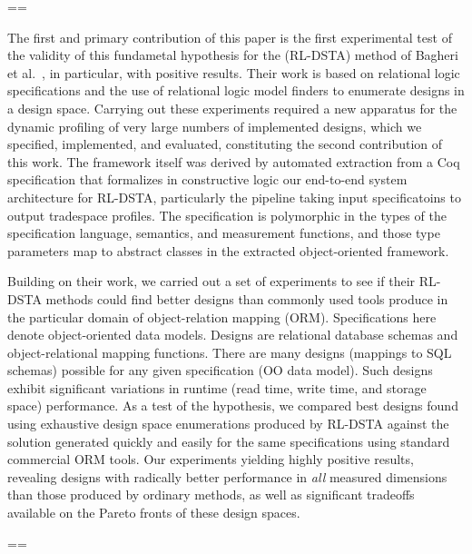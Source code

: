 ==

The first and primary contribution of this paper is the first experimental test of the validity of this fundametal hypothesis for the (RL-DSTA) method of Bagheri et al.~\cite{}, in particular, with positive results. Their work is based on relational logic specifications and the use of relational logic model finders to enumerate designs in a design space. Carrying out these experiments required a new apparatus for the dynamic profiling of very large numbers of implemented designs, which we specified, implemented, and evaluated, constituting the second contribution of this work. The framework itself was derived by automated extraction from a Coq specification that formalizes in constructive logic our end-to-end system architecture for RL-DSTA, particularly the pipeline taking input specificatoins to output tradespace profiles. The specification is polymorphic in the types of the specification language, semantics, and measurement functions, and those type parameters map to abstract classes in the extracted object-oriented framework.

Building on their work, we carried out a set of experiments to see if their RL-DSTA methods could find better designs than commonly used tools produce in the particular domain of object-relation mapping (ORM). Specifications here denote object-oriented data models. Designs are relational database schemas and object-relational mapping functions. There are many designs (mappings to SQL schemas) possible for any given specification (OO data model). Such designs exhibit significant variations in runtime (read time, write time, and storage space) performance. As a test of the hypothesis, we compared best designs found using exhaustive design space enumerations produced by RL-DSTA against the solution generated quickly and easily for the same specifications using standard commercial ORM tools.  Our experiments yielding highly positive results, revealing designs with radically better performance in {\em all} measured dimensions than those produced by ordinary methods, as well as significant tradeoffs available on the Pareto fronts of these design spaces. 


==

